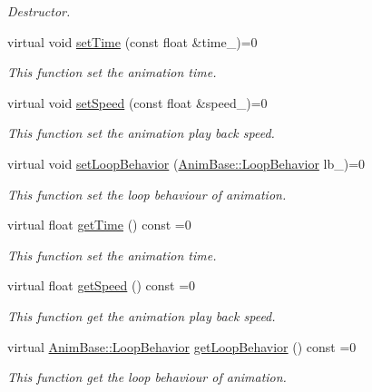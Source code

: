 \begin{DoxyCompactItemize}
\begin{DoxyCompactList}\small\item\em Destructor. \end{DoxyCompactList}\item 
virtual void \hyperlink{class_magnum_1_1_skeletal_anim_base_adac35e055a6c2cb2299d194c78e4787f}{set\+Time} (const float \&time\+\_\+)=0
\begin{DoxyCompactList}\small\item\em This function set the animation time. \end{DoxyCompactList}\item 
virtual void \hyperlink{class_magnum_1_1_skeletal_anim_base_a9bb5c7f49a6a6373dd3b453224fb951a}{set\+Speed} (const float \&speed\+\_\+)=0
\begin{DoxyCompactList}\small\item\em This function set the animation play back speed. \end{DoxyCompactList}\item 
virtual void \hyperlink{class_magnum_1_1_skeletal_anim_base_a35665d1455a2787a5a0a3f960ffea68e}{set\+Loop\+Behavior} (\hyperlink{class_magnum_1_1_anim_base_ad6b3de9518d395df5ca9865f268ec581}{Anim\+Base\+::\+Loop\+Behavior} lb\+\_\+)=0
\begin{DoxyCompactList}\small\item\em This function set the loop behaviour of animation. \end{DoxyCompactList}\item 
virtual float \hyperlink{class_magnum_1_1_skeletal_anim_base_ac05339297aaebfde498fdae4bbffeffa}{get\+Time} () const  =0
\begin{DoxyCompactList}\small\item\em This function set the animation time. \end{DoxyCompactList}\item 
virtual float \hyperlink{class_magnum_1_1_skeletal_anim_base_aa720c38bdce83e6e838693a603030a06}{get\+Speed} () const  =0
\begin{DoxyCompactList}\small\item\em This function get the animation play back speed. \end{DoxyCompactList}\item 
virtual \hyperlink{class_magnum_1_1_anim_base_ad6b3de9518d395df5ca9865f268ec581}{Anim\+Base\+::\+Loop\+Behavior} \hyperlink{class_magnum_1_1_skeletal_anim_base_a497edda28cd93d5816f20d4987f882ca}{get\+Loop\+Behavior} () const  =0
\begin{DoxyCompactList}\small\item\em This function get the loop behaviour of animation. \end{DoxyCompactList}\item 

\end{DoxyCompactItemize}
